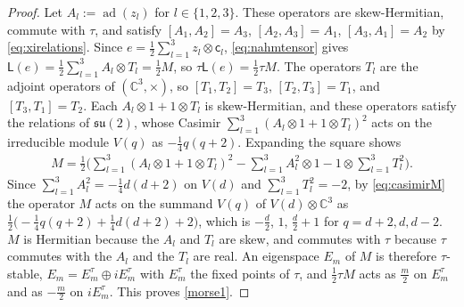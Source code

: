 \documentclass[leqno,10pt]{amsart}
\theoremstyle{definition}
\numberwithin{equation}{section}
\newcommand{\lin}{\mathsf{L}}
\newcommand{\su}{\mathfrak{su}}
\newcommand{\ad}{\operatorname{ad}}
\newcommand{\com}{\mathbb C}
\begin{document}
\begin{proof}
Let $A_{l} := \ad(z_{l})$ for $l \in \{1, 2, 3\}$. These operators are skew-Hermitian, commute with $\tau$, and satisfy $[A_{1}, A_{2}] = A_{3}$, $[A_{2}, A_{3}] = A_{1}$, $[A_{3}, A_{1}] = A_{2}$ by \eqref{eq:xirelations}. Since $e = \tfrac{1}{2}\sum_{l=1}^{3}z_{l} \otimes \mathsf{c}_{l}$, \eqref{eq:nahmtensor} gives $\lin(e) = \tfrac{1}{2}\sum_{l=1}^{3}A_{l} \otimes T_{l} = \tfrac{1}{2}M$, so $\tau\lin(e) = \tfrac{1}{2}\tau M$. The operators $T_{l}$ are the adjoint operators of $(\com^{3}, \times)$, so $[T_{1}, T_{2}] = T_{3}$, $[T_{2}, T_{3}] = T_{1}$, and $[T_{3}, T_{1}] = T_{2}$. Each $A_{l} \otimes 1 + 1 \otimes T_{l}$ is skew-Hermitian, and these operators satisfy the relations of $\su(2)$, whose Casimir $\sum_{l=1}^{3}(A_{l} \otimes 1 + 1 \otimes T_{l})^{2}$ acts on the irreducible module $V(q)$ as $-\tfrac{1}{4}q(q+2)$. Expanding the square shows
\begin{align}\label{eq:casimirM}
M = \tfrac{1}{2}\Big(\sum_{l=1}^{3}(A_{l} \otimes 1 + 1 \otimes T_{l})^{2} - \sum_{l=1}^{3}A_{l}^{2}\otimes 1 - 1 \otimes \sum_{l=1}^{3}T_{l}^{2}\Big).
\end{align}
Since $\sum_{l=1}^{3}A_{l}^{2} = -\tfrac{1}{4}d(d+2)$ on $V(d)$ and $\sum_{l=1}^{3}T_{l}^{2} = -2$, by \eqref{eq:casimirM} the operator $M$ acts on the summand $V(q)$ of $V(d) \otimes \com^{3}$ as $\tfrac{1}{2}\big(-\tfrac{1}{4}q(q+2) + \tfrac{1}{4}d(d+2) + 2\big)$, which is $-\tfrac{d}{2}$, $1$, $\tfrac{d}{2}+1$ for $q = d+2, d, d-2$. $M$ is Hermitian because the $A_{l}$ and $T_{l}$ are skew, and commutes with $\tau$ because $\tau$ commutes with the $A_{l}$ and the $T_{l}$ are real. An eigenspace $E_{m}$ of $M$ is therefore $\tau$-stable, $E_{m} = E_{m}^{\tau} \oplus iE_{m}^{\tau}$ with $E_{m}^{\tau}$ the fixed points of $\tau$, and $\tfrac{1}{2}\tau M$ acts as $\tfrac{m}{2}$ on $E_{m}^{\tau}$ and as $-\tfrac{m}{2}$ on $iE_{m}^{\tau}$. This proves \ref{morse1}.


\end{proof}
\end{document}
